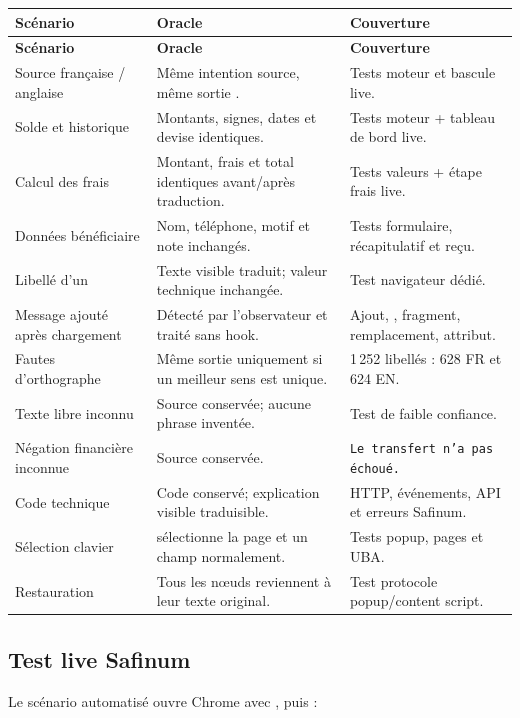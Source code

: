 \begin{longtable}{@{}|L{43mm}|L{55mm}|L{57mm}|@{}}
\hline
\textbf{Scénario} & \textbf{Oracle} & \textbf{Couverture}\\
\hline
\endfirsthead
\hline
\textbf{Scénario} & \textbf{Oracle} & \textbf{Couverture}\\
\hline
\endhead
Source française / anglaise &
Même intention source, même sortie . &
Tests moteur et bascule live.\\
\hline
Solde et historique &
Montants, signes, dates et devise identiques. &
Tests moteur + tableau de bord live.\\
\hline
Calcul des frais &
Montant, frais et total identiques avant/après traduction. &
Tests valeurs + étape frais live.\\
\hline
Données bénéficiaire &
Nom, téléphone, motif et note inchangés. &
Tests formulaire, récapitulatif et reçu.\\
\hline
Libellé d’un  &
Texte visible traduit; valeur technique inchangée. &
Test navigateur dédié.\\
\hline
Message ajouté après chargement &
Détecté par l’observateur et traité sans hook. &
Ajout, , fragment, remplacement, attribut.\\
\hline
Fautes d’orthographe &
Même sortie uniquement si un meilleur sens est unique. &
1\,252 libellés : 628 FR et 624 EN.\\
\hline
Texte libre inconnu &
Source conservée; aucune phrase inventée. &
Test de faible confiance.\\
\hline
Négation financière inconnue &
Source conservée. &
\texttt{Le transfert n'a pas échoué.}\\
\hline
Code technique &
Code conservé; explication visible traduisible. &
HTTP, événements, API et erreurs Safinum.\\
\hline
Sélection clavier &
 sélectionne la page et un champ normalement. &
Tests popup, pages et UBA.\\
\hline
Restauration &
Tous les nœuds reviennent à leur texte original. &
Test protocole popup/content script.\\
\hline
\end{longtable}

\subsection{Test live Safinum}

Le scénario automatisé ouvre Chrome avec , puis :

